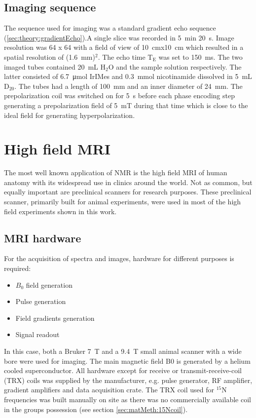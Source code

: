         \subsection{Imaging sequence}
        The sequence used for imaging was a standard gradient echo sequence (\ref{sec:theory:gradientEcho}).A single slice was recorded in \SI{5}{\minute} \SI{20}{\second}. Image resolution was 64 x 64 with a field of view of \SI{10}{\cm}x\SI{10}{\cm} which resulted in a spatial resolution of (\SI{1.6}{\mm})$^2$. The echo time $\mathrm{T_E}$ was set to \SI{150}{\milli\second}. The two imaged tubes contained \SI{20}{\milli\liter} H$_2$O and the sample solution respectively. The latter consisted of \SI{6.7}{\micro\mole} IrIMes and \SI{0.3}{\milli\mole} nicotinamide dissolved in \SI{5}{\milli\liter} $\mathrm{D_20}$. The tubes had a length of \SI{100}{\milli\meter} and an inner diameter of \SI{24}{\milli\meter}. The prepolarization coil was switched on for \SI{5}{\second} before each phase encoding step generating a prepolarization field of \SI{5}{\milli\tesla} during that time which is close to the ideal field for generating hyperpolarization.
    \section{High field MRI}
        The most well known application of NMR is the high field MRI of human anatomy with its widespread use in clinics around the world. Not as common, but equally important are preclinical scanners for research purposes. These preclinical scanner, primarily built for animal experiments, were used in most of the high field experiments shown in this work.  
        \subsection{MRI hardware}
            For the acquisition of spectra and images, hardware for different purposes is required:
            \begin{itemize}
            \item $B_0$ field generation
            \item Pulse generation
            \item Field gradients generation
            \item Signal readout
            \end{itemize}
            In this case, both a Bruker \SI{7}{\tesla} and a \SI{9.4}{\tesla} small animal scanner with a wide bore were used for imaging. The main magnetic field B0 is generated by a helium cooled superconductor. All hardware except for receive or transmit-receive-coil (TRX) coils was supplied by the manufacturer, e.g. pulse generator, RF amplifier, gradient amplifiers and data acquisition crate. The TRX coil used for $^{15}$N frequencies was built manually on site as there was no commercially available coil in the groups possession (see section \ref{sec:matMeth:15Ncoil}).
